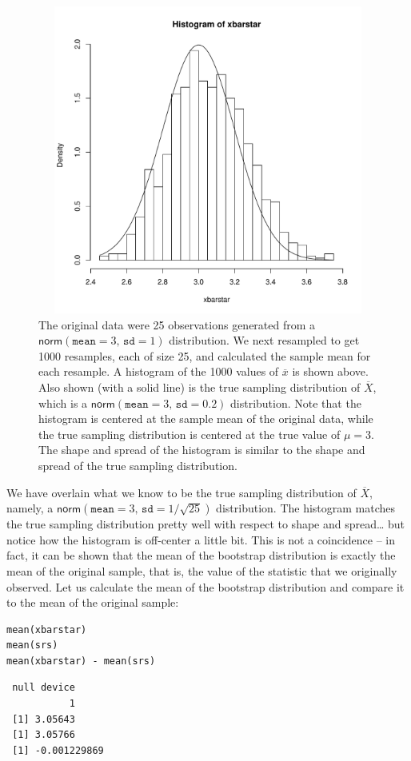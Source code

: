 \documentclass[captions=tableheading]{scrbook}
\begin{document}
\begin{example}
\begin{figure}[th]
    \includegraphics[width=5in, height=4in]{img/Bootstrap-se-mean.pdf}
    \caption[Bootstrapping the standard error of the mean, simulated data]{\small The original data were 25 observations generated from a \(\mathsf{norm}(\mathtt{mean}=3,\,\mathtt{sd}=1)\) distribution. We next resampled to get 1000 resamples, each of size 25, and calculated the sample mean for each resample. A histogram of the 1000 values of \(\overline{x}\) is shown above. Also shown (with a solid line) is the true sampling distribution of \(\overline{X}\), which is a \(\mathsf{norm}(\mathtt{mean}=3,\,\mathtt{sd}=0.2)\) distribution. Note that the histogram is centered at the sample mean of the original data, while the true sampling distribution is centered at the true value of \(\mu=3\). The shape and spread of the histogram is similar to the shape and spread of the true sampling distribution.}
    \label{fig:Bootstrap-se-mean}
  \end{figure}

We have overlain what we know to be the true sampling distribution of \(\overline{X}\), namely, a \(\mathsf{norm}(\mathtt{mean}=3,\,\mathtt{sd}=1/\sqrt{25})\) distribution. The histogram matches the true sampling distribution pretty well with respect to shape and spread\ldots{} but notice how the histogram is off-center a little bit. This is not a coincidence -- in fact, it can be shown that the mean of the bootstrap distribution is exactly the mean of the original sample, that is, the value of the statistic that we originally observed. Let us calculate the mean of the bootstrap distribution and compare it to the mean of the original sample:


\begin{verbatim}
mean(xbarstar)
mean(srs)
mean(xbarstar) - mean(srs)
\end{verbatim}

\begin{verbatim}
 null device 
           1
 [1] 3.05643
 [1] 3.05766
 [1] -0.001229869
\end{verbatim}

\end{example}
\end{document}
